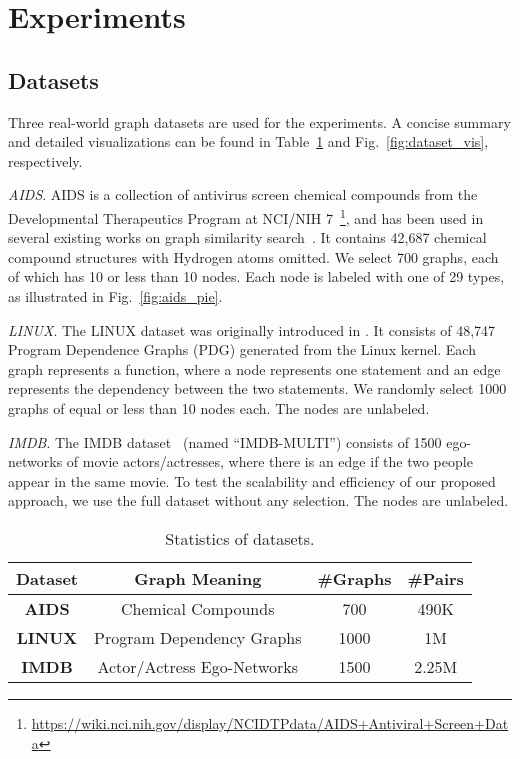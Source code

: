 \documentclass[sigconf]{acmart}
\begin{document}
 \section{Experiments} \label{sec-exp}

\subsection{Datasets}
Three real-world graph datasets are used for the experiments. A concise summary and detailed visualizations can be found in Table~\ref{dataset_summary} and Fig.~\ref{fig:dataset_vis}, respectively.

\textit{AIDS}. AIDS is a collection of antivirus screen chemical compounds from the Developmental Therapeutics Program at NCI/NIH 7~\footnote{\url{https://wiki.nci.nih.gov/display/NCIDTPdata/AIDS+Antiviral+Screen+Data}}, and has been used in several existing works on graph similarity search~\cite{zeng2009comparing,wang2012efficient,zheng2013graph,zhao2013partition,liang2017similarity}. It contains 42,687 chemical compound structures with Hydrogen atoms omitted. We select 700 graphs, each of which has 10 or less than 10 nodes. Each node is labeled with one of 29 types, as illustrated in Fig.~\ref{fig:aids_pie}. 

\textit{LINUX}. The LINUX dataset was originally introduced in \cite{wang2012efficient}. It consists of 48,747 Program Dependence Graphs (PDG) generated from the Linux kernel. Each graph represents a function, where a node represents one statement and an edge represents the dependency between the two statements. We randomly select 1000 graphs of equal or less than 10 nodes each. The nodes are unlabeled.

\textit{IMDB}. The IMDB dataset~\cite{yanardag2015deep} (named ``IMDB-MULTI'') consists of 1500 ego-networks of movie actors/actresses, where there is an edge if the two people appear in the same movie. To test the scalability and efficiency of our proposed approach, we use the full dataset without any selection. The nodes are unlabeled.



\begin{table}
\caption{Statistics of datasets.}
\small
\vspace*{-4mm}
\begin{tabular}
{|c|ccc|} \hline
\textbf{Dataset} & \textbf{Graph Meaning} & \textbf{\#Graphs} & \textbf{\#Pairs} \\ \hline
\textbf{AIDS} & {Chemical Compounds} & 700 & 490K \\ \hline
\textbf{LINUX} & {Program Dependency Graphs} & 1000 & 1M  \\ \hline
\textbf{IMDB} & {Actor/Actress Ego-Networks} & 1500 & 2.25M\\ \hline
\end{tabular}
\centering
\label{dataset_summary}
\vspace*{-2mm}
\end{table}
\end{document}
